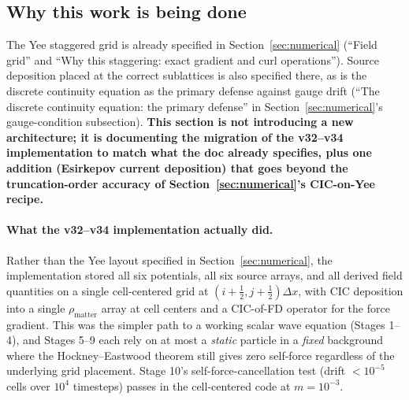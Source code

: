 \documentclass[11pt,a4paper]{article}
\begin{document}
\subsection{Why this work is being done}

The Yee staggered grid is already specified in
Section~\ref{sec:numerical} (``Field grid'' and ``Why this staggering:
exact gradient and curl operations'').  Source deposition placed at
the correct sublattices is also specified there, as is the discrete
continuity equation as the primary defense against gauge drift
(``The discrete continuity equation: the primary defense'' in
Section~\ref{sec:numerical}'s gauge-condition subsection).
\textbf{This section is not introducing a new architecture; it is
documenting the migration of the v32--v34 implementation to match
what the doc already specifies, plus one addition (Esirkepov current
deposition) that goes beyond the truncation-order accuracy of
Section~\ref{sec:numerical}'s CIC-on-Yee recipe.}

\paragraph{What the v32--v34 implementation actually did.}  Rather
than the Yee layout specified in Section~\ref{sec:numerical}, the
implementation stored all six potentials, all six source arrays, and
all derived field quantities on a single cell-centered grid at
$(i+\tfrac{1}{2}, j+\tfrac{1}{2})\Delta x$, with CIC deposition into a
single $\rho_{\mathrm{matter}}$ array at cell centers and a
CIC-of-FD operator for the force gradient.  This was the simpler
path to a working scalar wave equation (Stages 1--4), and Stages 5--9
each rely on at most a \emph{static} particle in a \emph{fixed}
background where the Hockney--Eastwood theorem still gives zero
self-force regardless of the underlying grid placement.  Stage 10's
self-force-cancellation test (drift $< 10^{-5}$ cells over $10^4$
timesteps) passes in the cell-centered code at $m = 10^{-3}$.
\end{document}
